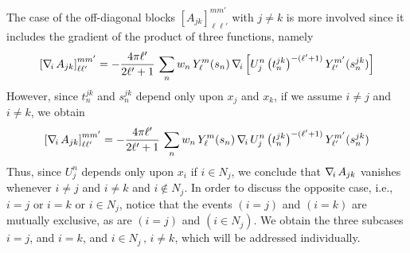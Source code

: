 The case of the off-diagonal blocks ${[ A_{jk}]}_{\ell \ell'}^{mm'}$ with $j \not=k$ is more involved since it includes the gradient of the product of three functions, namely
\begin{equation}\label{eq:7}
{[\nabla_{\!i}\,A_{jk}]}_{\ell \ell'}^{mm'} = -  \frac{4 \pi \ell'}{2 \ell'+1} \, \sum_{n} w_n\, Y_\ell^m(s_n) \,\nabla_{\!i}\, \Big[ U_j^n  \,  \big( t_n^{jk}\big)^{-(\ell'+1)} \, Y_{\ell'}^{m'} (s_n^{jk}) \Big]
\end{equation}
However, since $t_n^{jk}$ and $s_n^{jk}$ depend only upon $x_j$ and $x_k$, if we assume $i \not=j$ and $i\not=k$, we obtain
\begin{equation}\label{eq:8}
{[\nabla_{\!i}\,A_{jk}]}_{\ell \ell'}^{mm'} = -  \frac{4 \pi \ell'}{2 \ell'+1} \, \sum_{n} w_n\, Y_\ell^m(s_n) \,\nabla_{\!i}\, U_j^n  \,  \big( t_n^{jk}\big)^{-(\ell'+1)} \, Y_{\ell'}^{m'} (s_n^{jk})
\end{equation}
Thus, since $U_j^n$ depends only upon $x_i$ if $i \in N_j$, we conclude that $\nabla_{\!i}\, A_{jk}$ vanishes whenever $i \not= j$ and $i \not=k$ and $i \not\in N_j$. In order to discuss the opposite case, i.e., $i = j$ or $i =k$ or $i \in N_j$, notice that the events $(i = j)$ and $(i = k)$ are mutually exclusive, as are $(i = j)$ and $(i \in N_j)$. We obtain the three subcases $i = j$, and $i = k$, and $i \in N_j \, , \, i \not= k$, which will be addressed individually.

